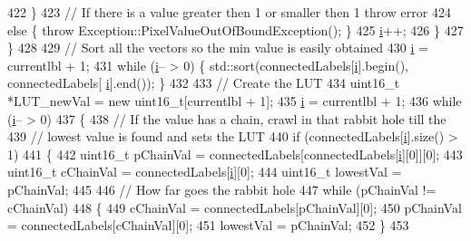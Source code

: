 \begin{DoxyCode}
422                 \}
423                 \textcolor{comment}{// If there is a value greater then 1 or smaller then 1 throw error}
424                 \textcolor{keywordflow}{else} \{ \textcolor{keywordflow}{throw} Exception::PixelValueOutOfBoundException(); \}
425                 \hyperlink{_comparision_pictures_2_createtest_image_8m_a6f6ccfcf58b31cb6412107d9d5281426}{i}++;
426             \}
427         \}
428 
429         \textcolor{comment}{// Sort all the vectors so the min value is easily obtained}
430         \hyperlink{_comparision_pictures_2_createtest_image_8m_a6f6ccfcf58b31cb6412107d9d5281426}{i} = currentlbl + 1;
431         \textcolor{keywordflow}{while} (\hyperlink{_comparision_pictures_2_createtest_image_8m_a6f6ccfcf58b31cb6412107d9d5281426}{i}-- > 0) \{ std::sort(connectedLabels[\hyperlink{_comparision_pictures_2_createtest_image_8m_a6f6ccfcf58b31cb6412107d9d5281426}{i}].begin(), connectedLabels[
      \hyperlink{_comparision_pictures_2_createtest_image_8m_a6f6ccfcf58b31cb6412107d9d5281426}{i}].end()); \}
432 
433         \textcolor{comment}{// Create the LUT}
434         uint16\_t *LUT\_newVal = \textcolor{keyword}{new} uint16\_t[currentlbl + 1];
435         \hyperlink{_comparision_pictures_2_createtest_image_8m_a6f6ccfcf58b31cb6412107d9d5281426}{i} = currentlbl + 1;
436         \textcolor{keywordflow}{while} (\hyperlink{_comparision_pictures_2_createtest_image_8m_a6f6ccfcf58b31cb6412107d9d5281426}{i}-- > 0)
437         \{
438             \textcolor{comment}{// If the value has a chain, crawl in that rabbit hole till the}
439             \textcolor{comment}{// lowest value is found and sets the LUT}
440             \textcolor{keywordflow}{if} (connectedLabels[\hyperlink{_comparision_pictures_2_createtest_image_8m_a6f6ccfcf58b31cb6412107d9d5281426}{i}].size() > 1)
441             \{
442                 uint16\_t pChainVal = connectedLabels[connectedLabels[\hyperlink{_comparision_pictures_2_createtest_image_8m_a6f6ccfcf58b31cb6412107d9d5281426}{i}][0]][0];
443                 uint16\_t cChainVal = connectedLabels[\hyperlink{_comparision_pictures_2_createtest_image_8m_a6f6ccfcf58b31cb6412107d9d5281426}{i}][0];
444                 uint16\_t lowestVal = pChainVal;
445 
446                 \textcolor{comment}{// How far goes the rabbit hole}
447                 \textcolor{keywordflow}{while} (pChainVal != cChainVal)
448                 \{
449                     cChainVal = connectedLabels[pChainVal][0];
450                     pChainVal = connectedLabels[cChainVal][0];
451                     lowestVal = pChainVal;
452                 \}
453 

\end{DoxyCode}
